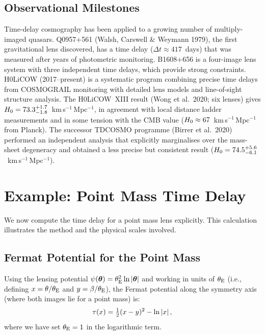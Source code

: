 \subsection{Observational Milestones}

Time-delay cosmography has been applied to a growing number of
multiply-imaged quasars.  Q0957+561 (Walsh, Carswell \& Weymann 1979),
the first gravitational lens discovered, has a time delay
($\Delta t \approx 417$~days) that was measured after years of
photometric monitoring.  B1608+656 is a four-image lens system with
three independent time delays, which provide strong constraints.
H0LiCOW (2017--present) is a systematic program combining precise time
delays from COSMOGRAIL monitoring with detailed lens models and
line-of-sight structure analysis.  The H0LiCOW~XIII result (Wong et al.\
2020; six lenses) gives
$H_0 = 73.3^{+1.7}_{-1.8}$~km\,s$^{-1}$\,Mpc$^{-1}$,
in agreement with local distance ladder measurements and in
some tension with the CMB value ($H_0 \approx 67$~km\,s$^{-1}$\,Mpc$^{-1}$
from Planck).  The successor TDCOSMO programme (Birrer et al.\ 2020)
performed an independent analysis that explicitly marginalises over the
mass-sheet degeneracy and obtained a less precise but consistent result
($H_0 = 74.5^{+5.6}_{-6.1}$~km\,s$^{-1}$\,Mpc$^{-1}$).


\section{Example: Point Mass Time Delay}
\label{sec:point_mass_time_delay}

We now compute the time delay for a point mass lens explicitly.  This
calculation illustrates the method and the physical scales involved.

\subsection{Fermat Potential for the Point Mass}

Using the lensing potential $\psi(\boldsymbol{\theta}) = \theta_{\mathrm{E}}^2 \ln|\boldsymbol{\theta}|$
and working in units of $\theta_{\mathrm{E}}$ (i.e., defining $x = \theta/\theta_{\mathrm{E}}$
and $y = \beta/\theta_{\mathrm{E}}$), the Fermat potential along the symmetry axis
(where both images lie for a point mass) is:
\begin{equation}
    \tau(x) = \tfrac{1}{2}(x - y)^2 - \ln|x| \,,
    \label{eq:tau_point_mass_1d}
\end{equation}
where we have set $\theta_{\mathrm{E}} = 1$ in the logarithmic term.

